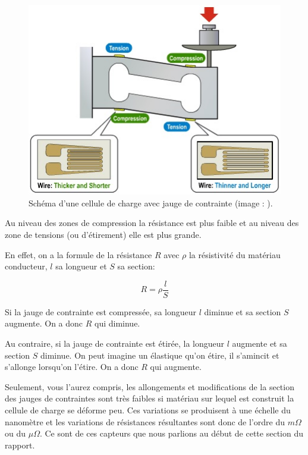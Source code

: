 \documentclass{polytech/polytech}
\begin{document}
\begin{figure}
\begin{center}
\includegraphics[scale=1]{image/load_cell.jpg}
\end{center}
\caption{Schéma d'une cellule de charge avec jauge de contrainte (image : \cite{sparkfun}).}
\label{fig:load_cell_sparkfun}
\end{figure}

Au niveau des zones de compression la résistance est plus faible et au niveau des zone de tensions (ou d'étirement) elle est plus grande.

En effet, on a la formule de la résistance $R$ avec $\rho$ la résistivité du matériau conducteur, $l$ sa longueur et $S$ sa section: 

\begin{equation}
R= \rho \frac{l}{S}
\end{equation}

Si la jauge de contrainte est compressée, sa longueur $l$ diminue et sa section $S$ augmente. On a donc $R$ qui diminue.

Au contraire, si la jauge de contrainte est étirée, la longueur $l$ augmente et sa section $S$ diminue. On peut imagine un élastique qu'on étire, il s'amincit et s'allonge lorsqu'on l'étire.  On a donc $R$ qui augmente.

Seulement, vous l'aurez compris, les allongements et modifications de la section des jauges de contraintes sont très faibles si matériau sur lequel est construit la cellule de charge se déforme peu. Ces variations se produisent à une échelle du nanomètre et les variations de résistances résultantes sont donc de l'ordre du $m\Omega$ ou du $\mu\Omega$. Ce sont de ces capteurs que nous parlions au début de cette section du rapport.
\end{document}
